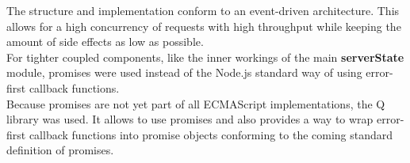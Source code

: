 \documentclass[../../../thesis.tex]{subfiles}
\begin{document}
The structure and implementation conform to an event-driven architecture\cite[chapter 2]{Etzion.2011}. This allows for a high concurrency of requests with high throughput while keeping the amount of side effects as low as possible.\\

For tighter coupled components, like the inner workings of the main \textbf{serverState} module, promises were used instead of the Node.js standard way of using error-first callback functions.\\
Because promises are not yet part of all ECMAScript implementations, the Q library\cite{q-library} was used. It allows to use promises and also provides a way to wrap error-first callback functions into promise objects conforming to the coming standard definition of promises\footnotemark .

\end{document}

